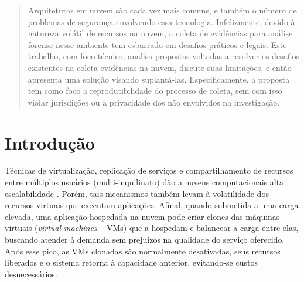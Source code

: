 \documentclass[conference]{IEEEtran}
\begin{document}
\maketitle

\begin{abstract}
Arquiteturas em nuvem são cada vez mais comuns, e também o número de problemas de segurança envolvendo essa tecnologia. 
%
Infelizmente, devido à natureza volátil de recursos na nuvem, a coleta de evidências para análise forense nesse ambiente tem esbarrado em desafios práticos e legais.
%
Este trabalho, com foco técnico, analisa propostas voltadas a resolver os desafios existentes na coleta evidências na nuvem, discute suas limitações, e então apresenta uma solução visando suplantá-las.
%
Especificamente, a proposta tem como foco a reprodutibilidade do processo de coleta, sem com isso violar jurisdições ou a privacidade dos não envolvidos na investigação.

\end{abstract}





%
\IEEEpeerreviewmaketitle

\section{Introdução}

%
Técnicas de virtualização, replicação de serviços e compartilhamento de recursos entre múltiplos usuários (multi-inquilinato) dão a nuvens computacionais alta escalabilidade \cite{Morsy_Cloud_Security:2010}.
%
Porém, tais mecanismos também levam à volatilidade dos recursos virtuais que executam aplicações.
%
Afinal, quando submetida a uma carga elevada, uma aplicação hospedada na nuvem pode criar clones das máquinas virtuais (\textit{virtual machines} -- VMs) que a hospedam e balancear a carga entre elas, buscando atender à demanda sem prejuízos na qualidade do serviço oferecido. 
%
Após esse pico, as VMs clonadas são normalmente desativadas, seus recursos liberados e o sistema retorna à capacidade anterior, evitando-se custos desnecessários.
\end{document}
